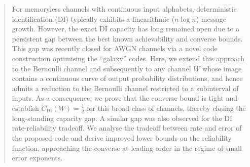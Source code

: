 \documentclass[10pt, conference]{IEEEtran}
\newcommand{\1}{\mathds{1}}
\begin{document}

\date{18 February 2026} 

\maketitle

\pagestyle{plain}


\begin{abstract}
For memoryless channels with continuous input alphabets, deterministic identification (DI) typically exhibits a linearithmic ($n\log n$) message growth. However, the exact DI capacity has long remained open due to a persistent gap between the best known achievability and converse bounds. This gap was recently closed for AWGN channels via a novel code construction optimising the ``galaxy'' codes. Here, we extend this approach to the Bernoulli channel and subsequently to any channel $W$ whose image contains a continuous curve of output probability distributions, and hence admits a reduction to the Bernoulli channel restricted to a subinterval of inputs. As a consequence, we prove that the converse bound is tight and establish $\dot{C}_{\text{DI}}(W) = \frac 12$ for this broad class of channels, thereby closing the long-standing capacity gap. 
A similar gap was also observed for the DI rate-reliability tradeoff. We analyse the tradeoff between rate and error of the proposed code and derive improved lower bounds on the reliability function, approaching the converse at leading order in the regime of small error exponents.
\end{abstract}
\end{document}
